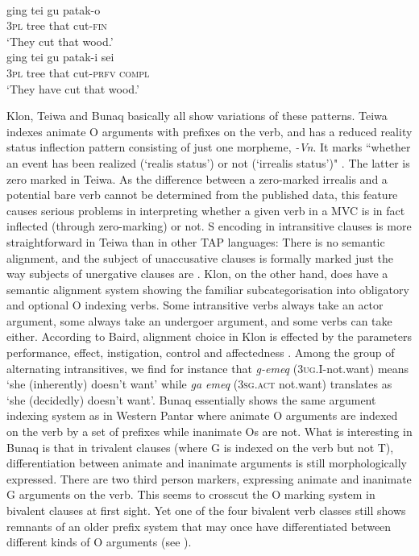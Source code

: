 \ea \label{kaera1}
 \\
\ea
\gll ging tei gu patak-o \\
\textsc{3}\textsc{pl} tree that cut-\textsc{fin} \\
\glft `They cut that wood.' \\ 
\ex
\gll ging tei gu patak-i sei \\ 
\textsc{3}\textsc{pl} tree that cut-\textsc{prfv} \textsc{compl} \\
\glft `They have cut that wood.'\\ 
\z
\z

Klon, Teiwa and Bunaq basically all show variations of these patterns. Teiwa indexes animate O arguments with prefixes on the verb, and has a reduced reality status inflection pattern consisting of just one morpheme, \textit{-Vn}. It marks ``whether an event has been realized (`realis status') or not (`irrealis status')" \citep[245]{klamer2010grammar}. The latter is zero marked in Teiwa. As the difference between a zero-marked irrealis and a potential bare verb cannot be determined from the published data, this feature causes serious problems in interpreting whether a given verb in a MVC is in fact inflected (through zero-marking) or not. S encoding in intransitive clauses is more straightforward in Teiwa than in other TAP languages: There is no semantic alignment, and the subject of unaccusative clauses is formally marked just the way subjects of unergative clauses are \citep[169]{klamer2010grammar}. Klon, on the other hand, does have a semantic alignment system showing the familiar subcategorisation into obligatory and optional O indexing verbs. Some intransitive verbs always take an actor argument, some always take an undergoer argument, and some verbs can take either. According to Baird, alignment choice in Klon is effected by the parameters performance, effect, instigation, control and affectedness \citep[52]{baird2008grammar}. Among the group of alternating intransitives, we find for instance that \textit{g-emeq} (\textsc{3ug.I}-not.want) means `she (inherently) doesn't want' while \textit{ga emeq} (\textsc{3sg.act} not.want) translates as `she (decidedly) doesn't want'. Bunaq essentially shows the same argument indexing system as in Western Pantar where animate O arguments are indexed on the verb by a set of prefixes while inanimate Os are not. What is interesting in Bunaq is that in trivalent clauses (where G is indexed on the verb but not T), differentiation between animate and inanimate arguments is still morphologically expressed. There are two third person markers, expressing animate and inanimate G arguments on the verb. This seems to crosscut the O marking system in bivalent clauses at first sight. Yet one of the four bivalent verb classes still shows remnants of an older prefix system that may once have differentiated between different kinds of O arguments (see \citealt[343]{schapper2009bunaq}). 

